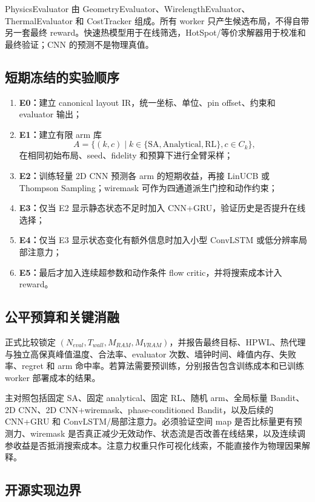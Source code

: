 \documentclass[UTF8,a4paper,11pt]{ctexart}
\begin{document}
PhysicsEvaluator 由 GeometryEvaluator、WirelengthEvaluator、ThermalEvaluator 和 CostTracker 组成。所有 worker 只产生候选布局，不得自带另一套最终 reward。快速热模型用于在线筛选，HotSpot/等价求解器用于校准和最终验证；CNN 的预测不是物理真值。

\subsection{短期冻结的实验顺序}

\begin{enumerate}
    \item \textbf{E0：}建立 canonical layout IR，统一坐标、单位、pin offset、约束和 evaluator 输出；
    \item \textbf{E1：}建立有限 arm 库
    \[
    A=\{(k,c)\mid k\in\{\mathrm{SA},\mathrm{Analytical},\mathrm{RL}\},c\in C_k\},
    \]
    在相同初始布局、seed、fidelity 和预算下进行全臂采样；
    \item \textbf{E2：}训练轻量 2D CNN 预测各 arm 的短期收益，再接 LinUCB 或 Thompson Sampling；wiremask 可作为四通道派生门控和动作约束；
    \item \textbf{E3：}仅当 E2 显示静态状态不足时加入 CNN+GRU，验证历史是否提升在线选择；
    \item \textbf{E4：}仅当 E3 显示状态变化有额外信息时加入小型 ConvLSTM 或低分辨率局部注意力；
    \item \textbf{E5：}最后才加入连续超参数和动作条件 flow critic，并将搜索成本计入 reward。
\end{enumerate}

\subsection{公平预算和关键消融}

正式比较锁定 $(N_{eval},T_{wall},M_{RAM},M_{VRAM})$，并报告最终目标、HPWL、热代理与独立高保真峰值温度、合法率、evaluator 次数、墙钟时间、峰值内存、失败率、regret 和 arm 命中率。若算法需要预训练，分别报告包含训练成本和已训练 worker 部署成本的结果。

主对照包括固定 SA、固定 analytical、固定 RL、随机 arm、全局标量 Bandit、2D CNN、2D CNN+wiremask、phase-conditioned Bandit，以及后续的 CNN+GRU 和 ConvLSTM/局部注意力。必须验证空间 map 是否比标量更有预测力、wiremask 是否真正减少无效动作、状态流是否改善在线结果，以及连续调参收益是否抵消搜索成本。注意力权重只作可视化线索，不能直接作为物理因果解释。

\subsection{开源实现边界}
\end{document}

